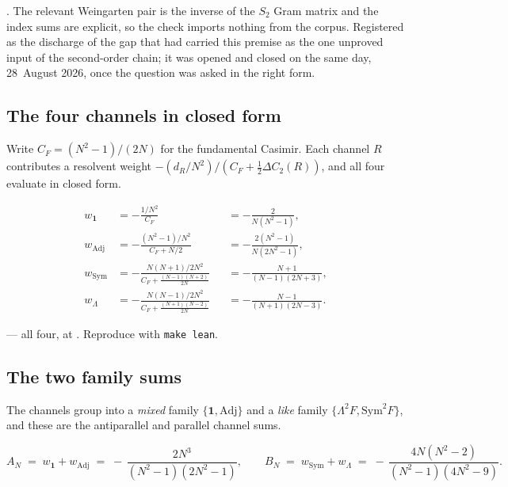 \noindent\Tone{}. The relevant Weingarten pair is the inverse of the
$S_2$ Gram matrix and the index sums are explicit, so the check imports
nothing from the corpus. Registered as the discharge of the gap that
had carried this premise as the one unproved input of the second-order
chain; it was opened and closed on the same day, 28~August 2026, once
the question was asked in the right form.

\subsection{The four channels in closed form}

Write $C_F = (N^2-1)/(2N)$ for the fundamental Casimir. Each channel
$R$ contributes a resolvent weight $-(d_R/N^2)/(C_F + \tfrac12 \Delta C_2(R))$,
and all four evaluate in closed form.

\begin{theorem}
\label{thm:channels}
\begin{align}
  w_{\mathbf 1}   &= -\frac{1/N^2}{C_F}
    &&= -\frac{2}{N(N^2-1)},
  \\[3pt]
  w_{\mathrm{Adj}} &= -\frac{(N^2-1)/N^2}{C_F + N/2}
    &&= -\frac{2(N^2-1)}{N(2N^2-1)},
  \\[3pt]
  w_{\mathrm{Sym}} &= -\frac{N(N+1)/2N^2}
                        {C_F + \frac{(N-1)(N+2)}{2N}}
    &&= -\frac{N+1}{(N-1)(2N+3)},
  \\[3pt]
  w_{\Lambda} &= -\frac{N(N-1)/2N^2}
                    {C_F + \frac{(N+1)(N-2)}{2N}}
    &&= -\frac{N-1}{(N+1)(2N-3)} .
\end{align}
\end{theorem}

\noindent\Tzero{} --- all four, at
. Reproduce with
\texttt{make lean}.

\subsection{The two family sums}

The channels group into a \emph{mixed} family $\{\mathbf 1, \mathrm{Adj}\}$
and a \emph{like} family $\{\Lambda^2 F, \mathrm{Sym}^2 F\}$, and these
are the antiparallel and parallel channel sums.

\begin{theorem}
\label{thm:families}
\begin{equation}
  A_N \;=\; w_{\mathbf 1} + w_{\mathrm{Adj}}
    \;=\; -\,\frac{2N^3}{(N^2-1)(2N^2-1)},
  \qquad
  B_N \;=\; w_{\mathrm{Sym}} + w_{\Lambda}
    \;=\; -\,\frac{4N(N^2-2)}{(N^2-1)(4N^2-9)} .
\end{equation}
\end{theorem}

